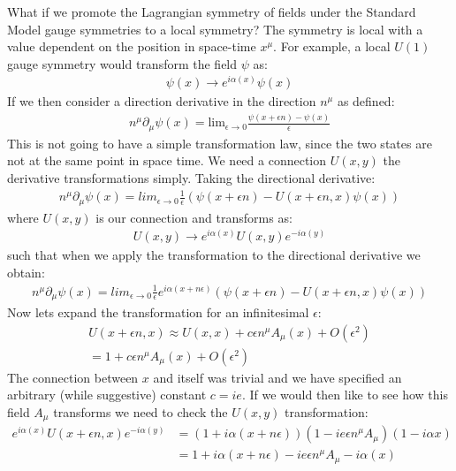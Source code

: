 What if we promote the Lagrangian symmetry of fields under the Standard Model gauge symmetries to a local symmetry? The symmetry is local 
with a value dependent on the position in space-time $x^\mu$. For example, a local $U(1)$ gauge symmetry would transform the field $\psi$ as:
\begin{align*}
\psi(x) \rightarrow e^{i\alpha(x)} \psi(x)
\end{align*}
If we then consider a direction derivative in the direction $n^\mu$ as defined:
\begin{align*}
n^\mu \partial _\mu \psi (x) = \textrm{lim}_{\epsilon\rightarrow 0} \frac{\psi(x + \epsilon n) - \psi(x)}{\epsilon}
\end{align*}
This is not going to have a simple transformation law, since the two states are not at the same
point in space time. We need a connection $U(x,y)$ the  derivative transformations simply. Taking the directional derivative:
\begin{align*}
n^\mu \partial _\mu \psi (x) = lim_{\epsilon\rightarrow 0} \frac{1}{\epsilon} \left ( \psi(x + \epsilon n) - U(x+\epsilon n, x) \psi(x) \right)
\end{align*}
where $U(x,y)$ is our connection and transforms as:
\begin{align*}
U(x,y) \rightarrow e^{i\alpha(x)} U(x,y) e^{-i\alpha (y)}
\end{align*}
such that when we apply the transformation to the directional derivative we obtain:
\begin{align*}
n^\mu \partial _\mu \psi (x) = lim_{\epsilon\rightarrow 0} \frac{1}{\epsilon} e^{i\alpha(x+n\epsilon)} \left ( \psi(x + \epsilon n) - U(x+\epsilon n, x) \psi(x) \right)
\end{align*}
Now lets expand the transformation for an infinitesimal $\epsilon$:
\begin{align*}
U(x+\epsilon n, x) \approx U(x,x) + c\epsilon n^\mu A_\mu (x) + O(\epsilon^2)\\
= 1 + c\epsilon n^\mu A_\mu (x) + O(\epsilon^2)
\end{align*}
The connection between $x$ and itself was trivial and we have specified an arbitrary (while suggestive) constant $c = ie$.
If we would then like to see how this field $A_\mu$ transforms we need to check the $U(x,y)$ transformation:
\begin{align*}
e^{i\alpha(x)} U(x+\epsilon n,x) e^{-i\alpha (y)} &= (1 + i \alpha(x+n\epsilon)) (1-ie\epsilon n^\mu A_\mu)(1 - i \alpha x) \\
&= 1 + i \alpha (x+n\epsilon ) - ie \epsilon n^\mu A_\mu - i\alpha(x)
\end{align*}
